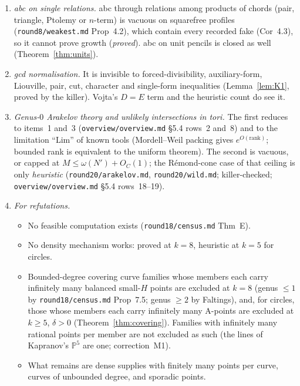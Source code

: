 \documentclass[11pt]{article}
\newcommand{\PP}{\mathbb P}
\newcommand{\rec}[1]{\texttt{#1}}
\begin{document}
\begin{enumerate}[leftmargin=2em]
{    \(S\) only through \(|S|\).}  These give at best \(M\le\omega(N')\) (lit18
    Props~A, B; \emph{unrefereed}).  Fixed-\(S\) theorems such as
    \rec{round18/theory.md} Thm~2.5 have \(S\)-dependent constants, and \(S\) is
    the unbounded set of primes of \(N\).
  \item \emph{abc on single relations.}  abc through relations among products
    of chords (pair, triangle, Ptolemy or \(n\)-term) is vacuous on squarefree
    profiles (\rec{round8/weakest.md} Prop~4.2), which contain every recorded
    fake (Cor~4.3), so it cannot prove growth (\emph{proved}).  abc on unit
    pencils is closed as well (Theorem~\ref{thm:units}).
  \item \emph{gcd normalisation.}  It is invisible to forced-divisibility,
    auxiliary-form, Liouville, pair, cut, character and single-form
    inequalities (Lemma~\ref{lem:K1}, proved by the killer).  Vojta's \(D=E\)
    term and the heuristic count do see it.
  \item \emph{Genus-\(0\) Arakelov theory and unlikely intersections in tori.}
    The first reduces to items~1 and~3 (\rec{overview/overview.md} \S5.4 rows~2
    and~8) and to the limitation ``Lim'' of known tools (Mordell--Weil packing
    gives \(e^{O(\mathrm{rank})}\); bounded rank is equivalent to the uniform
    theorem).  The second is vacuous, or capped at
    \(M\le\omega(N')+O_C(1)\); the R\'emond-cone case of that ceiling is only
    \emph{heuristic} (\rec{round20/arakelov.md}, \rec{round20/wild.md};
    killer-checked; \rec{overview/overview.md} \S5.4 rows~18--19).
  \item \emph{For refutations.}
    \begin{itemize}
      \item No feasible computation exists (\rec{round18/census.md} Thm~E).
      \item No density mechanism works: proved at \(k=8\), heuristic at
        \(k=5\) for circles.
      \item Bounded-degree covering curve families whose members each carry
        infinitely many balanced small-\(H\) points are excluded at \(k=8\)
        (genus \(\le1\) by \rec{round18/census.md} Prop~7.5; genus \(\ge2\) by
        Faltings), and, for circles, those whose members each carry infinitely
        many A-points are excluded at \(k\ge5\), \(\delta>0\)
        (Theorem~\ref{thm:covering}).  Families with infinitely many rational
        points per member are not excluded as such (the lines of Kapranov's
        \(\PP^5\) are one; correction~M1).
      \item What remains are dense supplies with finitely many points per
        curve, curves of unbounded degree, and sporadic points.
    \end{itemize}
\end{enumerate}
\end{document}
